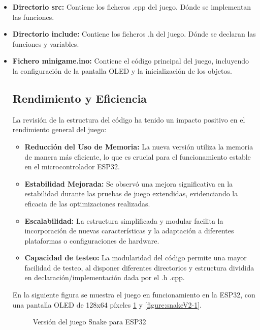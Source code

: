 \begin{itemize}
    \item \textbf{Directorio src:} Contiene los ficheros .cpp del juego. Dónde se implementan las funciones.
    \item \textbf{Directorio include:} Contiene los ficheros .h del juego. Dónde se declaran las funciones y variables.
    \item \textbf{Fichero minigame.ino:} Contiene el código principal del juego, incluyendo la configuración de la pantalla OLED y la inicialización de los objetos.

\subsection{Rendimiento y Eficiencia}

La revisión de la estructura del código ha tenido un impacto positivo en el rendimiento general del juego:

\begin{itemize}
    \item \textbf{Reducción del Uso de Memoria:} La nueva versión utiliza la memoria de manera más eficiente, lo que es crucial para el funcionamiento estable en el microcontrolador ESP32.
    \item \textbf{Estabilidad Mejorada:} Se observó una mejora significativa en la estabilidad durante las pruebas de juego extendidas, evidenciando la eficacia de las optimizaciones realizadas.
    \item \textbf{Escalabilidad:} La estructura simplificada y modular facilita la incorporación de nuevas características y la adaptación a diferentes plataformas o configuraciones de hardware.
    \item \textbf{Capacidad de testeo:} La modularidad del código permite una mayor facilidad de testeo, al disponer diferentes directorios y estructura dividida en declaración/implementación dada por el .h .cpp.
\end{itemize}

En la siguiente figura se muestra el juego en funcionamiento en la ESP32, con una pantalla OLED de 128x64 píxeles \ref{figure:snakeV2} y \ref{figure:snakeV2-1}.

\begin{figure}[!htb]
  \centering
  \caption{Versión del juego Snake para ESP32}
  \label{figure:snakeV2}
\end{figure}


\end{itemize}
